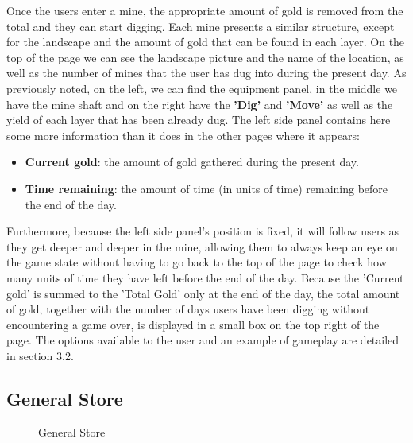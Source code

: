 \documentclass{mproj}
\begin{document}
Once the users enter a mine, the appropriate amount of gold is removed from the total and they can start digging. Each mine presents a similar structure, except for the landscape and the
amount of gold that can be found in each layer. On the top of the page we can see the landscape picture and the name of the location, as well as the number of mines that the user has dug into during the present day. As previously noted, on the left, we can find the equipment panel, in the middle we have the mine shaft and on the right have the \textbf {'Dig'} and \textbf{'Move'} as well as the yield of each layer that has been already dug. The left side panel contains here some more information than it does in the other pages where it appears:
\begin{itemize}
  	\item \textbf{Current gold}: the amount of gold gathered during the present day.
  	\item \textbf{Time remaining}: the amount of time (in units of time) remaining before the end of the day.
\end{itemize} 
Furthermore, because the left side panel's position is fixed, it will follow users as they get deeper and deeper in the mine, allowing them to always keep an eye on the game state without having to go back to the top of the page to check how many units of time they have left before the end of the day. Because the 'Current gold' is summed to the 'Total Gold' only at the end of the day, the total amount of gold, together with the number of days users have been digging without encountering a game over, is displayed in a small box on the top right of the page.
 The options available to the user and an example of gameplay are detailed in section 3.2.

\subsection{General Store}

\begin{figure} [h] 
	\centering
	\caption{General Store}
           \label{fig: generalstore}
\end{figure}
\end{document}
